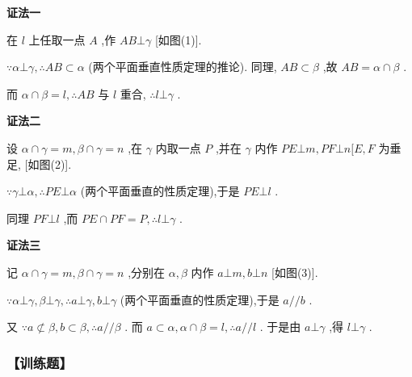 \textbf{证法一} 

在 $l$ 上任取一点 $A$ ,作 ${AB} \bot  \gamma$ [如图(1)].

$\because \alpha  \bot  \gamma ,\therefore {AB} \subset  \alpha$ (两个平面垂直性质定理的推论). 同理, ${AB} \subset  \beta$ ,故 ${AB} = \alpha  \cap  \beta$ .

而 $\alpha  \cap  \beta  = l,\therefore {AB}$ 与 $l$ 重合, $\therefore l \bot  \gamma$ .


\textbf{证法二} 

设 $\alpha  \cap  \gamma  = m,\beta  \cap  \gamma  = n$ ,在 $\gamma$ 内取一点 $P$ ,并在 $\gamma$ 内作 ${PE} \bot  m,{PF} \bot  n\lbrack E,F$ 为垂足, [如图(2)].

$\because \gamma  \bot  \alpha ,\therefore {PE} \bot  \alpha$ (两个平面垂直的性质定理),于是 ${PE} \bot  l$ .

同理 ${PF} \bot  l$ ,而 ${PE} \cap  {PF} = P,\therefore l \bot  \gamma$ .

\textbf{证法三} 

记 $\alpha  \cap  \gamma  = m,\beta  \cap  \gamma  = n$ ,分别在 $\alpha ,\beta$ 内作 $a \bot  m,b \bot  n$ [如图(3)].

$\because \alpha  \bot  \gamma ,\beta  \bot  \gamma ,\therefore a \bot  \gamma ,b \bot  \gamma$ (两个平面垂直的性质定理),于是 $a//b$ .

又 $\because a \not \subset \beta ,b \subset  \beta ,\therefore a//\beta$ . 而 $a \subset  \alpha ,\alpha  \cap  \beta  = l,\therefore a//l$ . 于是由 $a\bot \gamma$ ,得 $l\bot \gamma$ .

\subsubsection*{【训练题】}


